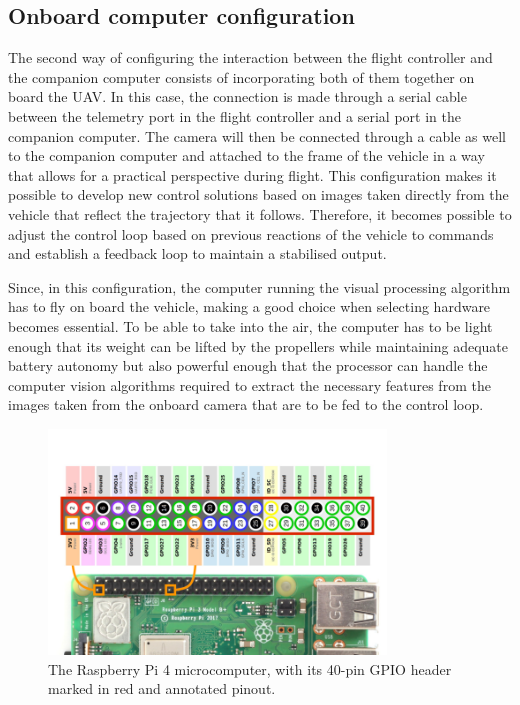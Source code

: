 \subsection{Onboard computer configuration}
\label{subsec:onboard}

The second way of configuring the interaction between the flight controller and the companion computer consists of incorporating both of them together on board the UAV.
In this case, the connection is made through a serial cable between the telemetry port in the flight controller and a serial port in the companion computer.
The camera will then be connected through a cable as well to the companion computer and attached to the frame of the vehicle in a way that allows for a practical perspective during flight.
This configuration makes it possible to develop new control solutions based on images taken directly from the vehicle that reflect the trajectory that it follows.
Therefore, it becomes possible to adjust the control loop based on previous reactions of the vehicle to commands and establish a feedback loop to maintain a stabilised output.

Since, in this configuration, the computer running the visual processing algorithm has to fly on board the vehicle, making a good choice when selecting hardware becomes essential.
To be able to take into the air, the computer has to be light enough that its weight can be lifted by the propellers while maintaining adequate battery autonomy but also powerful enough that the processor can handle the computer vision algorithms required to extract the necessary features from the images taken from the onboard camera that are to be fed to the control loop.

\begin{figure}
  \centering
  \includegraphics[width=0.8\textwidth,keepaspectratio]{img/rpi4-pinout.png}
  \caption{The Raspberry Pi 4 microcomputer, with its 40-pin GPIO header marked in red and annotated pinout.}
  \label{fig:rpi4-pinout}
\end{figure}

